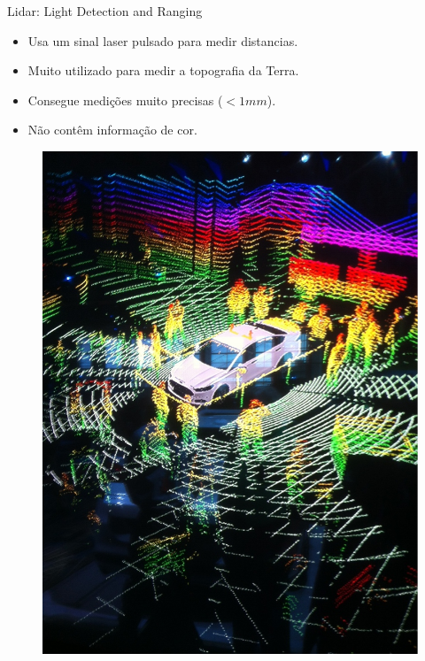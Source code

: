 \begin{frame}{Lidar: Light Detection and Ranging}
						
	\begin{minipage}{0.5\textwidth}
		\begin{itemize}
			\item Usa um sinal laser pulsado para medir distancias.
			\item Muito utilizado para medir a topografia da Terra.
			\item Consegue medições muito precisas ($<1mm$).
			\item Não contêm informação de cor.
		\end{itemize}
	\end{minipage}%
	\begin{minipage}{0.5\textwidth}
		\begin{figure}
			\includegraphics[width=.9\textwidth]{img/lidar.jpg}
		\end{figure}
	\end{minipage}

\end{frame}